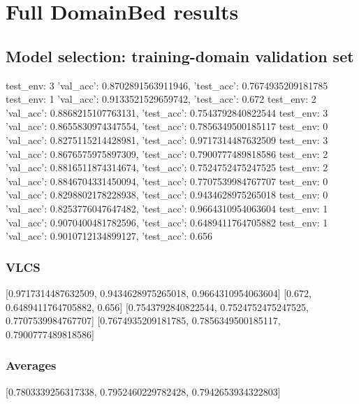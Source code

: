 \documentclass{article}
\begin{document}
\section{Full DomainBed results}

\subsection{Model selection: training-domain validation set}
test_env: 3
{'val_acc': 0.8702891563911946, 'test_acc': 0.7674935209181785}
test_env: 1
{'val_acc': 0.9133521529659742, 'test_acc': 0.672}
test_env: 2
{'val_acc': 0.8868215107763131, 'test_acc': 0.7543792840822544}
test_env: 3
{'val_acc': 0.8655830974347554, 'test_acc': 0.7856349500185117}
test_env: 0
{'val_acc': 0.8275115214428981, 'test_acc': 0.9717314487632509}
test_env: 3
{'val_acc': 0.8676575975897309, 'test_acc': 0.7900777489818586}
test_env: 2
{'val_acc': 0.8816511874314674, 'test_acc': 0.7524752475247525}
test_env: 2
{'val_acc': 0.8846704331450094, 'test_acc': 0.7707539984767707}
test_env: 0
{'val_acc': 0.8298802178228938, 'test_acc': 0.9434628975265018}
test_env: 0
{'val_acc': 0.8253776047647482, 'test_acc': 0.9664310954063604}
test_env: 1
{'val_acc': 0.9070400481782596, 'test_acc': 0.6489411764705882}
test_env: 1
{'val_acc': 0.9010712134899127, 'test_acc': 0.656}

\subsubsection{VLCS}
[0.9717314487632509, 0.9434628975265018, 0.9664310954063604]
[0.672, 0.6489411764705882, 0.656]
[0.7543792840822544, 0.7524752475247525, 0.7707539984767707]
[0.7674935209181785, 0.7856349500185117, 0.7900777489818586]

\begin{center}
\end{center}

\subsubsection{Averages}
[0.7803339256317338, 0.7952460229782428, 0.7942653934322803]

\begin{center}
\end{center}
\end{document}

